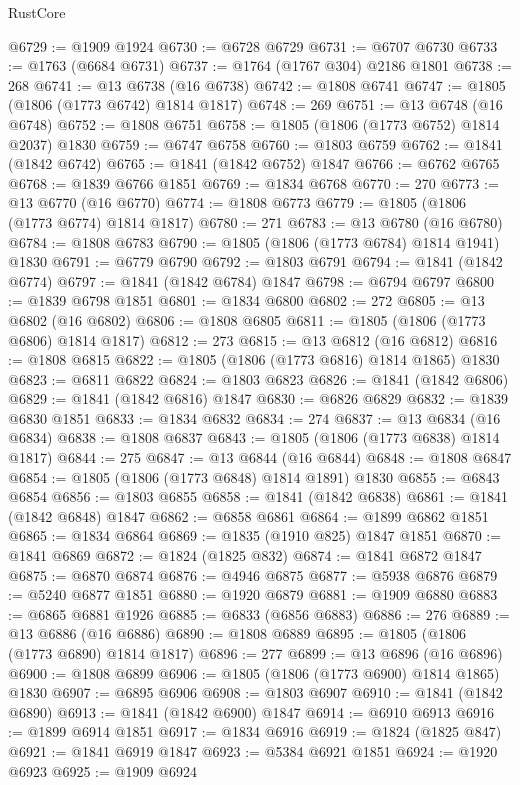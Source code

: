 \begin{lexlean}{RustCore}
\begin{coremodule}
@6729 := @1909 @1924
@6730 := @6728 @6729
@6731 := @6707 @6730
@6733 := @1763 (@6684 @6731)
@6737 := @1764 (@1767 @304) @2186 @1801
@6738 := 268
@6741 := @13 @6738 (@16 @6738)
@6742 := @1808 @6741
@6747 := @1805 (@1806 (@1773 @6742) @1814 @1817)
@6748 := 269
@6751 := @13 @6748 (@16 @6748)
@6752 := @1808 @6751
@6758 := @1805 (@1806 (@1773 @6752) @1814 @2037) @1830
@6759 := @6747 @6758
@6760 := @1803 @6759
@6762 := @1841 (@1842 @6742)
@6765 := @1841 (@1842 @6752) @1847
@6766 := @6762 @6765
@6768 := @1839 @6766 @1851
@6769 := @1834 @6768
@6770 := 270
@6773 := @13 @6770 (@16 @6770)
@6774 := @1808 @6773
@6779 := @1805 (@1806 (@1773 @6774) @1814 @1817)
@6780 := 271
@6783 := @13 @6780 (@16 @6780)
@6784 := @1808 @6783
@6790 := @1805 (@1806 (@1773 @6784) @1814 @1941) @1830
@6791 := @6779 @6790
@6792 := @1803 @6791
@6794 := @1841 (@1842 @6774)
@6797 := @1841 (@1842 @6784) @1847
@6798 := @6794 @6797
@6800 := @1839 @6798 @1851
@6801 := @1834 @6800
@6802 := 272
@6805 := @13 @6802 (@16 @6802)
@6806 := @1808 @6805
@6811 := @1805 (@1806 (@1773 @6806) @1814 @1817)
@6812 := 273
@6815 := @13 @6812 (@16 @6812)
@6816 := @1808 @6815
@6822 := @1805 (@1806 (@1773 @6816) @1814 @1865) @1830
@6823 := @6811 @6822
@6824 := @1803 @6823
@6826 := @1841 (@1842 @6806)
@6829 := @1841 (@1842 @6816) @1847
@6830 := @6826 @6829
@6832 := @1839 @6830 @1851
@6833 := @1834 @6832
@6834 := 274
@6837 := @13 @6834 (@16 @6834)
@6838 := @1808 @6837
@6843 := @1805 (@1806 (@1773 @6838) @1814 @1817)
@6844 := 275
@6847 := @13 @6844 (@16 @6844)
@6848 := @1808 @6847
@6854 := @1805 (@1806 (@1773 @6848) @1814 @1891) @1830
@6855 := @6843 @6854
@6856 := @1803 @6855
@6858 := @1841 (@1842 @6838)
@6861 := @1841 (@1842 @6848) @1847
@6862 := @6858 @6861
@6864 := @1899 @6862 @1851
@6865 := @1834 @6864
@6869 := @1835 (@1910 @825) @1847 @1851
@6870 := @1841 @6869
@6872 := @1824 (@1825 @832)
@6874 := @1841 @6872 @1847
@6875 := @6870 @6874
@6876 := @4946 @6875
@6877 := @5938 @6876
@6879 := @5240 @6877 @1851
@6880 := @1920 @6879
@6881 := @1909 @6880
@6883 := @6865 @6881 @1926
@6885 := @6833 (@6856 @6883)
@6886 := 276
@6889 := @13 @6886 (@16 @6886)
@6890 := @1808 @6889
@6895 := @1805 (@1806 (@1773 @6890) @1814 @1817)
@6896 := 277
@6899 := @13 @6896 (@16 @6896)
@6900 := @1808 @6899
@6906 := @1805 (@1806 (@1773 @6900) @1814 @1865) @1830
@6907 := @6895 @6906
@6908 := @1803 @6907
@6910 := @1841 (@1842 @6890)
@6913 := @1841 (@1842 @6900) @1847
@6914 := @6910 @6913
@6916 := @1899 @6914 @1851
@6917 := @1834 @6916
@6919 := @1824 (@1825 @847)
@6921 := @1841 @6919 @1847
@6923 := @5384 @6921 @1851
@6924 := @1920 @6923
@6925 := @1909 @6924

\end{coremodule}
\end{lexlean}
